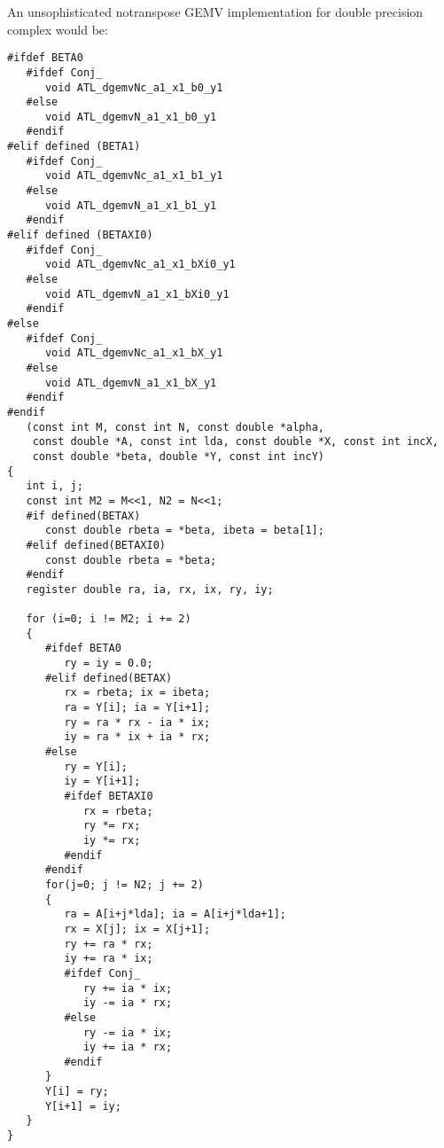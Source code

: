 \documentclass[11pt]{article}
\begin{document}
An unsophisticated notranspose GEMV implementation for double precision
complex would be:
\begin{verbatim}
#ifdef BETA0
   #ifdef Conj_
      void ATL_dgemvNc_a1_x1_b0_y1
   #else
      void ATL_dgemvN_a1_x1_b0_y1
   #endif
#elif defined (BETA1)
   #ifdef Conj_
      void ATL_dgemvNc_a1_x1_b1_y1
   #else
      void ATL_dgemvN_a1_x1_b1_y1
   #endif
#elif defined (BETAXI0)
   #ifdef Conj_
      void ATL_dgemvNc_a1_x1_bXi0_y1
   #else
      void ATL_dgemvN_a1_x1_bXi0_y1
   #endif
#else
   #ifdef Conj_
      void ATL_dgemvNc_a1_x1_bX_y1
   #else
      void ATL_dgemvN_a1_x1_bX_y1
   #endif
#endif
   (const int M, const int N, const double *alpha,
    const double *A, const int lda, const double *X, const int incX,
    const double *beta, double *Y, const int incY)
{
   int i, j;
   const int M2 = M<<1, N2 = N<<1;
   #if defined(BETAX)
      const double rbeta = *beta, ibeta = beta[1];
   #elif defined(BETAXI0)
      const double rbeta = *beta;
   #endif
   register double ra, ia, rx, ix, ry, iy;

   for (i=0; i != M2; i += 2)
   {
      #ifdef BETA0
         ry = iy = 0.0;
      #elif defined(BETAX)
         rx = rbeta; ix = ibeta;
         ra = Y[i]; ia = Y[i+1];
         ry = ra * rx - ia * ix;
         iy = ra * ix + ia * rx;
      #else
         ry = Y[i];
         iy = Y[i+1];
         #ifdef BETAXI0
            rx = rbeta;
            ry *= rx;
            iy *= rx;
         #endif
      #endif
      for(j=0; j != N2; j += 2)
      {
         ra = A[i+j*lda]; ia = A[i+j*lda+1];
         rx = X[j]; ix = X[j+1];
         ry += ra * rx;
         iy += ra * ix;
         #ifdef Conj_
            ry += ia * ix;
            iy -= ia * rx;
         #else
            ry -= ia * ix;
            iy += ia * rx;
         #endif
      }
      Y[i] = ry;
      Y[i+1] = iy;
   }
}
\end{verbatim}
\end{document}

